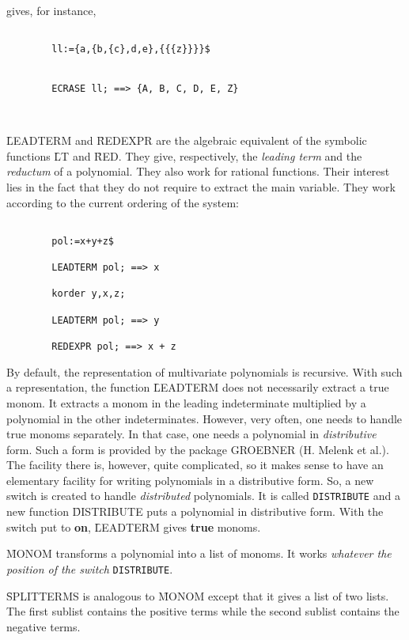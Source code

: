 gives, for instance,
\begin{verbatim}

        ll:={a,{b,{c},d,e},{{{z}}}}$


        ECRASE ll; ==> {A, B, C, D, E, Z}



\end{verbatim}
\item[ii.]
\f{LEADTERM} and \f{REDEXPR} are the algebraic equivalent of the
symbolic functions \f{LT} and \f{RED}. They give, respectively, the
{\em leading term} and the {\em reductum} of a polynomial. They also work
for rational functions. Their interest lies in the fact that they do not
require to extract the main variable. They work according to the current
ordering of the system:
\begin{verbatim}

        pol:=x+y+z$

        LEADTERM pol; ==> x

        korder y,x,z;

        LEADTERM pol; ==> y

        REDEXPR pol; ==> x + z

\end{verbatim}
By default, the representation of multivariate polynomials is recursive.
With such a representation, the function \f{LEADTERM} does not necessarily
extract a true monom. It extracts a monom in the leading indeterminate
multiplied by a polynomial in the other indeterminates. However, very often,
 one needs to handle true monoms separately. In that case, one needs a
polynomial in {\em distributive} form. Such a form is provided by the
package GROEBNER (H. Melenk et al.). The facility there is, however,
quite complicated, so it makes sense to have
an elementary facility for writing polynomials in a distributive form. So,
a new switch is created to handle {\em distributed} polynomials. It is
called {\tt DISTRIBUTE} and a new function \f{DISTRIBUTE} puts a
polynomial in distributive form. With the switch put to {\bf on},
\f{LEADTERM} gives {\bf true} monoms.

\f{MONOM} transforms a polynomial into a list of monoms. It works
{\em whatever the position of the switch} {\tt DISTRIBUTE}.

\f{SPLITTERMS} is analogous to \f{MONOM} except that it gives
a list of two lists. The first sublist contains the positive terms
while the second sublist contains the negative terms.

